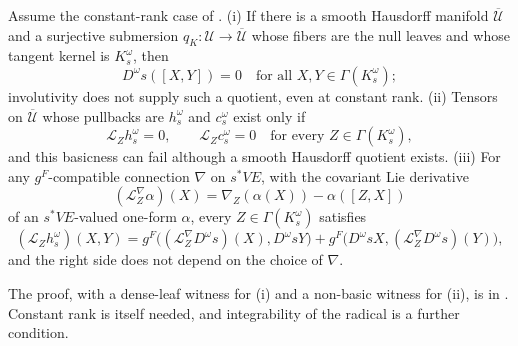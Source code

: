 Assume the constant-rank case of . (i) If there is a smooth
Hausdorff manifold \(\overline{\mathcal U}\) and a surjective submersion
\(q_K:\mathcal U\to\overline{\mathcal U}\) whose fibers are the null leaves and whose tangent kernel is
\(K_s^\omega\), then
\begin{equation}
D^\omega s([X,Y])=0
\quad
\text{for all }X,Y\in\Gamma(K_s^\omega);
\label{eq:pb-null-involutivity}
\end{equation}
involutivity does not supply such a quotient, even at constant rank. (ii) Tensors on
\(\overline{\mathcal U}\) whose pullbacks are \(h_s^\omega\) and \(c_s^\omega\) exist only if
\begin{equation}
\mathcal L_Zh_s^\omega=0,
\qquad
\mathcal L_Zc_s^\omega=0
\quad\text{for every }Z\in\Gamma(K_s^\omega),
\label{eq:pb-null-basicness}
\end{equation}
and this basicness can fail although a smooth Hausdorff quotient exists. (iii) For any
\(g^F\)-compatible connection \(\nabla\) on \(s^*VE\), with the covariant Lie derivative
\begin{equation}
(\mathcal L_Z^\nabla\alpha)(X)
=\nabla_Z(\alpha(X))-\alpha([Z,X])
\label{eq:pb-covariant-lie-derivative}
\end{equation}
of an \(s^*VE\)-valued one-form \(\alpha\), every \(Z\in\Gamma(K_s^\omega)\) satisfies
\begin{equation}
(\mathcal L_Zh_s^\omega)(X,Y)
=g^F\bigl((\mathcal L_Z^\nabla D^\omega s)(X),D^\omega sY\bigr)
+g^F\bigl(D^\omega sX,(\mathcal L_Z^\nabla D^\omega s)(Y)\bigr),
\label{eq:pb-basicness-criterion}
\end{equation}
and the right side does not depend on the choice of \(\nabla\). 

The proof, with a dense-leaf witness for (i) and a non-basic witness for (ii), is in
. Constant rank is itself needed, and integrability of the radical is a further
condition.

